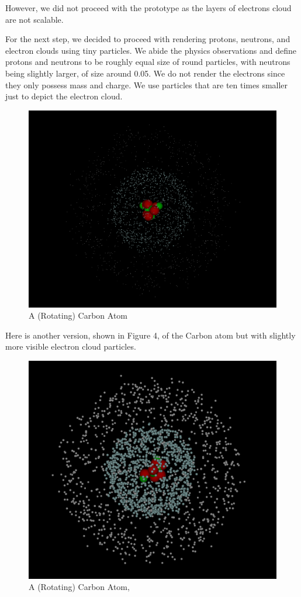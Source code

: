 \documentclass[acmtog]{acmart}
\begin{document}
However, we did not proceed with the prototype as the layers of electrons cloud are not scalable.

For the next step, we decided to proceed with rendering protons, neutrons, and electron clouds using tiny particles. We abide the physics observations and define protons and neutrons to be roughly equal size of round particles, with neutrons being slightly larger, of size around 0.05. We do not render the electrons since they only possess mass and charge. We use particles that are ten times smaller just to depict the electron cloud.

\begin{figure}[h]
  \centering
  \includegraphics[width=\linewidth]{./carbon.png}
  \caption{A (Rotating) Carbon Atom}
\end{figure}

Here is another version, shown in Figure 4, of the Carbon atom but with slightly more visible electron cloud particles.

\begin{figure}[h]
  \centering
  \includegraphics[width=\linewidth]{./carbon_2.png}
  \caption{A (Rotating) Carbon Atom,}
\end{figure}
\end{document}

